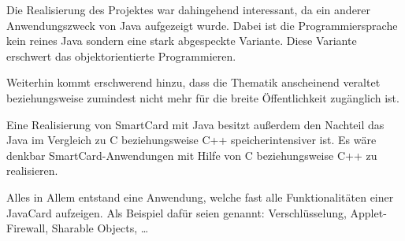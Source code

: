 Die Realisierung des Projektes war dahingehend interessant, da ein anderer Anwendungszweck von Java aufgezeigt wurde.
Dabei ist die Programmiersprache kein reines Java sondern eine stark abgespeckte Variante.
Diese Variante erschwert das objektorientierte Programmieren.

Weiterhin kommt erschwerend hinzu, dass die Thematik  anscheinend veraltet beziehungsweise zumindest nicht mehr für die breite Öffentlichkeit zugänglich ist.

Eine Realisierung von SmartCard mit Java besitzt außerdem den Nachteil das Java im Vergleich zu C beziehungsweise C++ speicherintensiver ist.
Es wäre denkbar SmartCard-Anwendungen mit Hilfe von C beziehungsweise C++ zu realisieren.

Alles in Allem entstand eine Anwendung, welche fast alle Funktionalitäten einer JavaCard aufzeigen.
Als Beispiel dafür seien genannt: Verschlüsselung, Applet-Firewall, Sharable Objects, \dots



